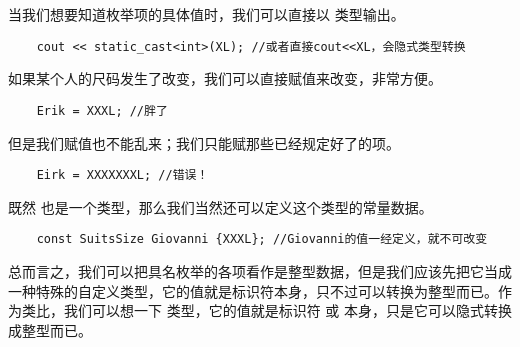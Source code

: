 当我们想要知道枚举项的具体值时，我们可以直接以 \lstinline@int@ 类型输出。
\begin{lstlisting}
    cout << static_cast<int>(XL); //或者直接cout<<XL，会隐式类型转换
\end{lstlisting}\par
如果某个人的尺码发生了改变，我们可以直接赋值来改变，非常方便。
\begin{lstlisting}
    Erik = XXXL; //胖了
\end{lstlisting}
但是我们赋值也不能乱来；我们只能赋那些已经规定好了的项。
\begin{lstlisting}
    Eirk = XXXXXXXL; //错误！
\end{lstlisting}
既然 \lstinline@SuitsSize@ 也是一个类型，那么我们当然还可以定义这个类型的常量数据。
\begin{lstlisting}
    const SuitsSize Giovanni {XXXL}; //Giovanni的值一经定义，就不可改变
\end{lstlisting}\par
总而言之，我们可以把具名枚举的各项看作是整型数据，但是我们应该先把它当成一种特殊的自定义类型，它的值就是标识符本身，只不过可以转换为整型而已。作为类比，我们可以想一下 \lstinline@bool@ 类型，它的值就是标识符 \lstinline@true@ 或 \lstinline@false@ 本身，只是它可以隐式转换成整型而已。\par
